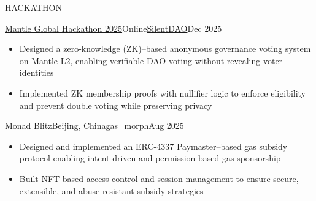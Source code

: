 \documentclass{resume} %
\begin{document}

\begin{rSection}{HACKATHON}

\begin{rSubsection}{\href{https://github.com/Noe1017/SilentDAO}{\textup{Mantle Global Hackathon 2025}}}{Online}{\href{https://github.com/Noe1017/SilentDAO}{\textup{SilentDAO}}}{\textup{Dec 2025}}
\begin{itemize}
\setlength\itemsep{-0.5em}
\item Designed a zero-knowledge (ZK)--based anonymous governance voting system on Mantle L2, enabling verifiable DAO voting without revealing voter identities
\item Implemented ZK membership proofs with nullifier logic to enforce eligibility and prevent double voting while preserving privacy
\end{itemize}
\end{rSubsection}

\begin{rSubsection}{\href{https://luma.com/o5rjsvpc?tk=qwiw43}{Monad Blitz}}{Beijing, China}{\href{https://github.com/Noe1017/gas_morph}{\textup{gas\_morph}}}{\textup{Aug 2025}}
\begin{itemize}
\setlength\itemsep{-0.5em}
\item Designed and implemented an ERC-4337 Paymaster--based gas subsidy protocol enabling intent-driven and permission-based gas sponsorship
\item Built NFT-based access control and session management to ensure secure, extensible, and abuse-resistant subsidy strategies
\end{itemize}
\end{rSubsection}

\end{rSection}


\end{document}
